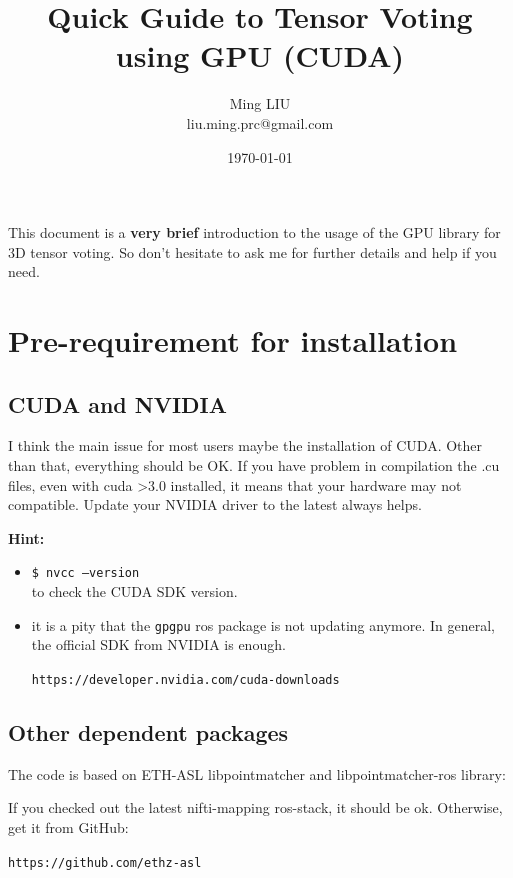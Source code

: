 \documentclass[a4paper, 11pt]{article}
\title{\centering \LARGE \bf  Quick Guide to Tensor Voting using GPU (CUDA)}
\date{\today}
\author{Ming LIU \\  liu.ming.prc@gmail.com}
\begin{document}
\maketitle

This document is a \textbf{very brief} introduction to the usage of the GPU library for 3D tensor voting. So don't hesitate to ask me for further details and help if you need.

\section{Pre-requirement for installation}

\subsection{CUDA and NVIDIA}
I think the main issue for most users maybe the installation of CUDA. Other than that, everything should be OK.
If you have problem in compilation the .cu files, even with cuda >3.0 installed, it means that your hardware may not compatible.
Update your NVIDIA driver to the latest always helps.


\textbf{Hint:}
  \begin{itemize}
  \item 
{\tt \$ nvcc --version} \\
to check the CUDA SDK version.

  \item 
it is a pity that the {\tt gpgpu} ros package is not updating anymore. In general, the official SDK from NVIDIA is enough.

{\tt https://developer.nvidia.com/cuda-downloads}
  \end{itemize}

\subsection{Other dependent packages}
The code is based on ETH-ASL libpointmatcher and libpointmatcher-ros library:

If you checked out the latest nifti-mapping ros-stack, it should be ok. Otherwise, get it from GitHub:

{\tt https://github.com/ethz-asl}
\end{document}
